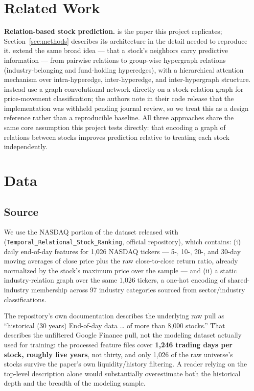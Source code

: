 \documentclass[11pt]{article}
\begin{document}
\section{Related Work}
\label{sec:related}

\textbf{Relation-based stock prediction.} \citet{feng2019temporal} is the paper this project
replicates; Section~\ref{sec:methods} describes its architecture in the detail needed to reproduce
it. \citet{cui2023temporal} extend the same broad idea --- that a stock's neighbors carry
predictive information --- from pairwise relations to group-wise hypergraph relations
(industry-belonging and fund-holding hyperedges), with a hierarchical attention mechanism over
intra-hyperedge, inter-hyperedge, and inter-hypergraph structure. \citet{jafari2022gcnet} instead
use a graph convolutional network directly on a stock-relation graph for price-movement
classification; the authors note in their code release that the implementation was withheld
pending journal review, so we treat this as a design reference rather than a reproducible
baseline. All three approaches share the same core assumption this project tests directly: that
encoding a graph of relations between stocks improves prediction relative to treating each stock
independently.

\section{Data}
\label{sec:data}

\subsection{Source}

We use the NASDAQ portion of the dataset released with \citet{feng2019temporal}
(\texttt{Temporal\_Relational\_Stock\_Ranking}, official repository), which contains: (i) daily
end-of-day features for 1{,}026 NASDAQ tickers --- 5-, 10-, 20-, and 30-day moving averages of
close price plus the raw close-to-close return ratio, already normalized by the stock's maximum
price over the sample --- and (ii) a static industry-relation graph over the same 1{,}026 tickers,
a one-hot encoding of shared-industry membership across 97 industry categories sourced from
sector/industry classifications.

The repository's own documentation describes the underlying raw pull as ``historical (30 years)
End-of-day data \ldots{} of more than 8,000 stocks.'' That describes the unfiltered Google Finance
pull, not the modeling dataset actually used for training: the processed feature files cover
\textbf{1{,}246 trading days per stock, roughly five years}, not thirty, and only 1{,}026 of the
raw universe's stocks survive the paper's own liquidity/history filtering. A reader relying on the
top-level description alone would substantially overestimate both the historical depth and the
breadth of the modeling sample.
\end{document}
